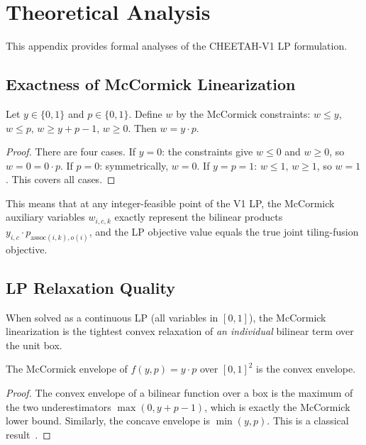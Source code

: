 
\section{Theoretical Analysis}
\label{sec:theory}

This appendix provides formal analyses of the CHEETAH-V1 LP formulation.

\subsection{Exactness of McCormick Linearization}

\begin{proposition}
\label{prop:mccormick_exact}
Let $y \in \{0,1\}$ and $p \in \{0,1\}$. Define $w$ by the McCormick constraints:
$w \leq y$, $w \leq p$, $w \geq y + p - 1$, $w \geq 0$.
Then $w = y \cdot p$.
\end{proposition}

\begin{proof}
There are four cases. If $y=0$: the constraints give $w \leq 0$ and $w \geq 0$, so $w = 0 = 0 \cdot p$. If $p=0$: symmetrically, $w = 0$. If $y = p = 1$: $w \leq 1$, $w \geq 1$, so $w = 1$. This covers all cases.
\end{proof}

This means that at any integer-feasible point of the V1 LP, the McCormick auxiliary variables $w_{i,c,k}$ exactly represent the bilinear products $y_{i,c} \cdot p_{\text{assoc}(i,k), o(i)}$, and the LP objective value equals the true joint tiling-fusion objective.

\subsection{LP Relaxation Quality}

When solved as a continuous LP (all variables in $[0,1]$), the McCormick linearization is the tightest convex relaxation of \emph{an individual} bilinear term over the unit box.

\begin{proposition}
The McCormick envelope of $f(y,p) = y \cdot p$ over $[0,1]^2$ is the convex envelope.
\end{proposition}

\begin{proof}
The convex envelope of a bilinear function over a box is the maximum of the two underestimators $\max(0, y + p - 1)$, which is exactly the McCormick lower bound. Similarly, the concave envelope is $\min(y, p)$. This is a classical result~\citep{mccormick1976computability}.
\end{proof}

